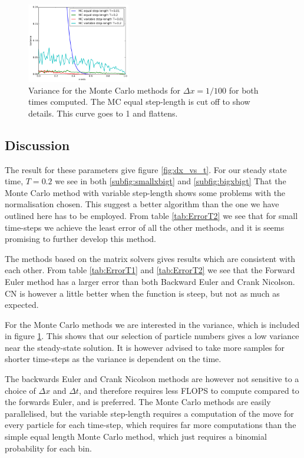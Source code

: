 \documentclass[11pt,a4paper,final]{article}
\numberwithin{equation}{section}
\begin{document}
\begin{figure}
\centering
\includegraphics[width=0.4\textwidth]{pics/variance.png}
\caption{Variance for the Monte Carlo methods for $\Delta x = 1/100$
for both times computed. The MC equal step-length is cut off to show 
details. This curve goes to 1 and flattens.}
\label{fig:MCvariance}
\end{figure}


\subsection{Discussion}



The result for these parameters give figure \ref{fig:dx_vs_t}. For 
our steady state time, $T = 0.2$ we see in both \ref{subfig:smallxbigt} and 
\ref{subfig:bigxbigt} That the Monte Carlo method with variable 
step-length shows some problems with the normalisation chosen. This suggest 
a better algorithm than the one we have outlined here has to be employed. 
From table \ref{tab:ErrorT2} we see that for small time-steps we
achieve the least error of all the other methods, and it is seems 
promising to further develop this method.

The methods based on the matrix solvers gives results which are consistent
with each other. From table \ref{tab:ErrorT1} and \ref{tab:ErrorT2} we 
see that the Forward Euler method has a larger error than both Backward 
Euler and Crank Nicolson. CN is however a little better when the 
function is steep, but not as much as expected.

For the Monte Carlo methods we are interested in the variance, which is 
included in figure \ref{fig:MCvariance}. This shows that our selection of 
particle numbers gives a low variance near the steady-state solution. 
It is however advised to take more samples for shorter time-steps as 
the variance is dependent on the time.

The backwards Euler and Crank Nicolson methods are however not sensitive  
to a choice of $\Delta x$ and $\Delta t$, and therefore requires 
less FLOPS to compute compared to the forwards Euler, and is preferred.
The Monte Carlo methods are easily parallelised, but the variable step-length
requires a computation of the move for every particle for each time-step,
which requires far more computations than the simple equal length
Monte Carlo method,
which just requires a binomial probability for each bin.
\end{document}
